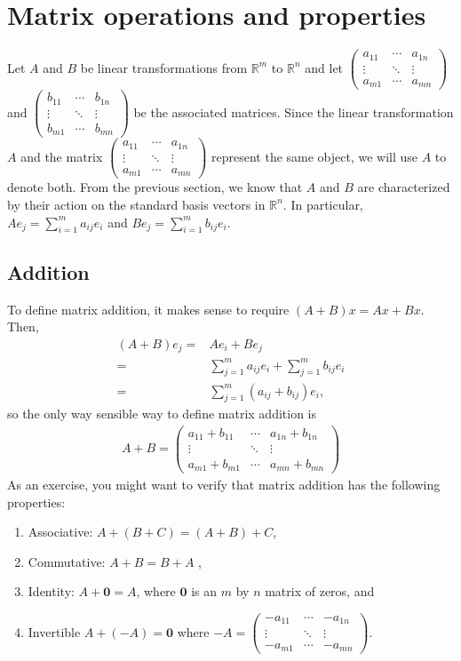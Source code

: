 \documentclass[12pt,reqno]{amsart}
\def\R{\mathbb{R}}
\newcommand{\gmatrix}[1]{\begin{pmatrix} {#1}_{11} & \cdots &
    {#1}_{1n} \\ \vdots & \ddots & \vdots \\ {#1}_{m1} & \cdots &
    {#1}_{mn} \end{pmatrix}}
\theoremstyle{definition}
\begin{document}
\section{Matrix operations and properties}

Let $A$ and $B$ be linear transformations from $\R^m$ to $\R^n$ and
let $\gmatrix{a}$ and $\gmatrix{b}$ be the associated matrices.  Since
the linear transformation $A$ and the matrix $\gmatrix{a}$ represent
the same object, we will use $A$ to denote both.  From the previous
section, we know that $A$ and $B$ are characterized by their action on
the standard basis vectors in $\R^n$. In particular, $A e_j =
\sum_{i=1}^m a_{ij} e_i$ and $B e_j = \sum_{i=1}^m b_{ij} e_i$. 


\subsection{Addition} 
To define matrix addition, it makes sense to
require $(A+B)x = Ax + Bx$. Then,
\begin{align*}
  (A + B) e_j = & A e_i + B e_j \\
  = & \sum_{j=1}^m a_{ij} e_i + \sum_{j=1}^m b_{ij} e_i\\
  = & \sum_{j=1}^m (a_{ij} + b_{ij}) e_i,
\end{align*}
so the only way sensible way to define matrix addition is 
\begin{align*}
  A + B = \begin{pmatrix} a_{11} + b_{11} & \cdots &
    a_{1n} + b_{1n}  \\ \vdots & \ddots & \vdots \\ a_{m1} + b_{m1} & \cdots &
    a_{mn}+b_{mn} \end{pmatrix}
\end{align*}
As an exercise, you might want to verify that matrix addition has the
following properties:
\begin{enumerate}
\item Associative: $A+(B + C) = (A+B) + C$,
\item Commutative: $A + B = B + A$ ,
\item Identity: $A + \mathbf{0} = A$, where $\mathbf{0}$ is an $m$ by
  $n$ matrix of zeros, and
\item Invertible $A + (-A) = \mathbf{0}$ where $-A = \gmatrix{-a}$.
\end{enumerate}
\end{document}

